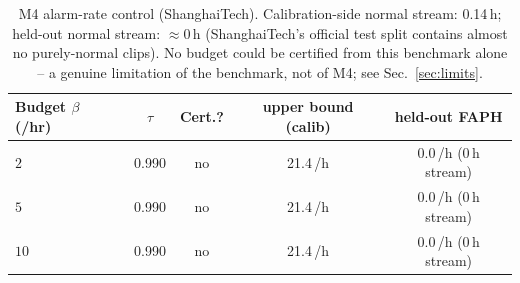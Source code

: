\begin{table}[t]
\centering
\caption{M4 alarm-rate control (ShanghaiTech). Calibration-side normal stream:
0.14\,h; held-out normal stream: $\approx$0\,h (ShanghaiTech's official test
split contains almost no purely-normal clips). No budget could be certified
from this benchmark alone -- a genuine limitation of the benchmark, not of M4;
see Sec.~\ref{sec:limits}.}
\label{tab:rc}
\setlength{\tabcolsep}{5pt}
\renewcommand{\arraystretch}{1.15}
\footnotesize
\begin{tabular}{@{}lcccc@{}}
\toprule
Budget $\beta$ (/hr) & $\tau$ & Cert.? & upper bound (calib) & held-out FAPH \\
\midrule
$2$   & 0.990 & no & 21.4\,/h & 0.0\,/h (0\,h stream) \\
$5$   & 0.990 & no & 21.4\,/h & 0.0\,/h (0\,h stream) \\
$10$  & 0.990 & no & 21.4\,/h & 0.0\,/h (0\,h stream) \\
\bottomrule
\end{tabular}
\end{table}
